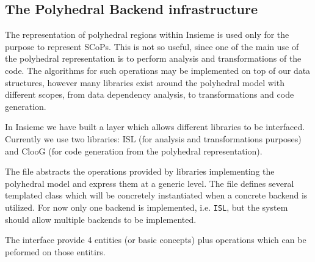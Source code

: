 \subsection{The Polyhedral Backend infrastructure}

The representation of polyhedral regions within Insieme is used only for the
purpose to represent SCoPs. This is not so useful, since one of the main use of
the polyhedral representation is to perform analysis and transformations of the
code. The algorithms for such operations may be implemented on top of our data
structures, however many libraries exist around the polyhedral model with
different scopes, from data dependency analysis, to transformations and code
generation. 

In Insieme we have built a layer which allows different libraries to be
interfaced. Currently we use two libraries: ISL (for analysis and
transformations purposes) and ClooG (for code generation from the polyhedral
representation).

The file  abstracts the operations provided
by libraries implementing the polyhedral model and express them at a generic
level. The file defines several templated class which will be concretely
instantiated when a concrete backend is utilized. For now only one backend is
implemented, i.e. {\tt ISL}, but the system should allow multiple backends to be
implemented. 

The interface provide 4 entities (or basic concepts) plus operations which can
be peformed on those entitirs. 

